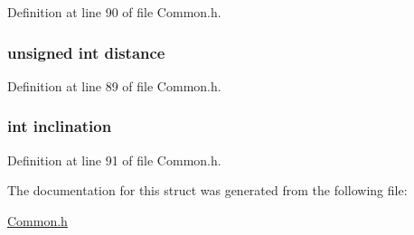 Definition at line 90 of file Common.\+h.

\hypertarget{struct_tracking_data_a4bb47863775a37236bda65273c01b275}{
\subsubsection[{distance}]{\setlength{\rightskip}{0pt plus 5cm}unsigned int distance}}\label{struct_tracking_data_a4bb47863775a37236bda65273c01b275}


Definition at line 89 of file Common.\+h.

\hypertarget{struct_tracking_data_af308b9934394c8bcf7614eb1df2d863f}{
\subsubsection[{inclination}]{\setlength{\rightskip}{0pt plus 5cm}int inclination}}\label{struct_tracking_data_af308b9934394c8bcf7614eb1df2d863f}


Definition at line 91 of file Common.\+h.



The documentation for this struct was generated from the following file\+:\begin{DoxyCompactItemize}
\item 
\hyperlink{_common_8h}{Common.\+h}\end{DoxyCompactItemize}
